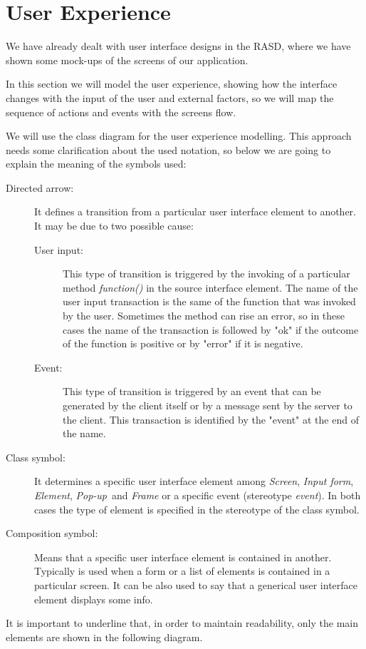 \section{User Experience}
We have already dealt with user interface designs in the RASD, where we have shown some mock-ups of the screens of our application.

In this section we will model the user experience, showing how the interface changes with the input of the user and external factors, so we will map the sequence of actions and events with the screens flow.

We will use the class diagram for the user experience modelling. This approach needs some clarification about the used notation, so below we are going to explain the meaning of the symbols used:

\begin{description}
\item[Directed arrow:] It defines a transition from a particular user interface element to another. It may be due to two possible cause:
	\begin{description}
	\item[User input:] This type of transition is triggered by the invoking of a particular method \textit{function()} in the source interface element.
	The name of the user input transaction is the same of the function that was invoked by the user. Sometimes the method can rise an error, so in these cases the name of the transaction is followed by "ok" if the outcome of the function is positive or by "error" if it is negative. 
	\item[Event:] This type of transition is triggered by an event that can be generated by the client itself or by a message sent  by the server to the client. This transaction is identified by the "event" at the end of the name.
	\end{description} 
\item[Class symbol:] It determines a specific user interface element among \textit{Screen}, \textit{Input form}, \textit{Element}, \textit{Pop-up}\ and \textit{Frame}
or a specific event (stereotype \textit{event}). In both cases the type of element is specified in the stereotype of the class symbol. 
\item[Composition symbol:] Means that a specific user interface element is contained in another. Typically is used when a form or a list of elements is contained in a particular screen. It can be also used to say that a generical user interface element displays some info.
\end{description}

It is important to underline that, in order to maintain readability, only the main elements are shown in the following diagram.


